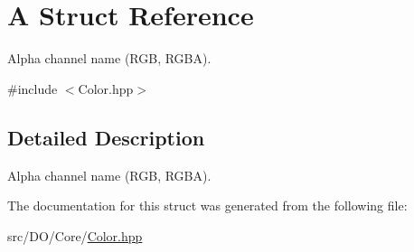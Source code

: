 \hypertarget{struct_d_o_1_1_a}{\section{A Struct Reference}
\label{struct_d_o_1_1_a}
}


Alpha channel name (R\-G\-B, R\-G\-B\-A).  




{\ttfamily \#include $<$Color.\-hpp$>$}



\subsection{Detailed Description}
Alpha channel name (R\-G\-B, R\-G\-B\-A). 

The documentation for this struct was generated from the following file\-:\begin{DoxyCompactItemize}
\item 
src/\-D\-O/\-Core/\hyperlink{_color_8hpp}{Color.\-hpp}\end{DoxyCompactItemize}
